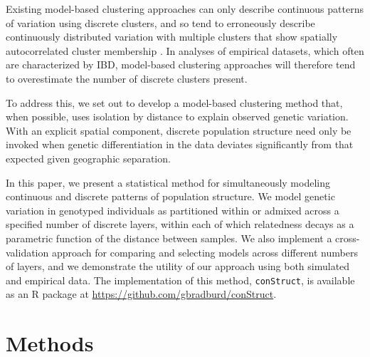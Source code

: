 \documentclass[12pt]{article}
\begin{document}
Existing model-based clustering approaches can only describe continuous patterns of variation using
discrete clusters, and so tend to erroneously describe continuously distributed variation with multiple clusters that 
show spatially autocorrelated cluster membership \citep{Frantz2009,meirmans2012}.
In analyses of empirical datasets, which often are characterized by IBD,
model-based clustering approaches will therefore tend to overestimate
the number of discrete clusters present. 


To address this, we set out to develop
a model-based clustering method that, when possible, uses isolation by distance 
to explain observed genetic variation.
With an explicit spatial component, discrete population structure need only be invoked when genetic differentiation 
in the data deviates significantly from that expected given geographic separation.

In this paper, we present a statistical method for simultaneously 
modeling continuous and discrete patterns of population structure.
We model genetic variation in genotyped individuals as 
partitioned within or admixed across a specified number of discrete layers,
within each of which relatedness decays as a parametric function of the distance between samples.
We also implement a cross-validation approach for comparing and selecting models across different numbers of layers,
and we demonstrate the utility of our approach using both simulated and empirical data.
The implementation of this method, \texttt{conStruct}, is available as an R package at 
\href{https://github.com/gbradburd/conStruct}{https://github.com/gbradburd/conStruct}.

\section*{Methods}
\end{document}
